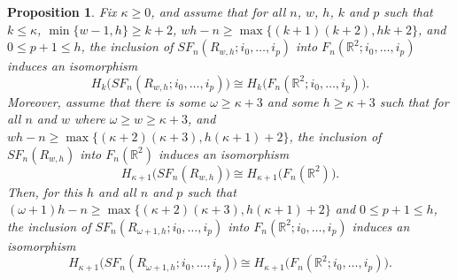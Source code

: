 \documentclass[pagebackref,colorlinks,citecolor=blue,linkcolor=blue,urlcolor=blue,filecolor=blue]{article}
\newtheorem{prop}[thm]{Proposition}
\theoremstyle{definition}\newtheorem{definition}[thm]{Definition}
\theoremstyle{definition}
\newcommand{\R}{\ensuremath{\mathbb{R}}}
\begin{document}
\begin{prop}\label{super proposition} 
Fix $\kappa\ge 0$, and assume that for all $n$, $w$, $h$, $k$ and $p$ such that $k\le\kappa$, $\min\{w-1, h\}\ge k+2$, $wh-n\ge \max\big\{(k+1)(k+2), hk+2\big\}$, and $0\le p+1\le h$, the inclusion of $SF_{n}(R_{w,h}; i_{0}, \dots, i_{p})$ into $F_{n}(\R^{2}; i_{0}, \dots, i_{p})$ induces an isomorphism
\[
H_{k}\big(SF_{n}(R_{w,h}; i_{0}, \dots, i_{p})\big)\cong H_{k}\big(F_{n}(\R^{2}; i_{0}, \dots, i_{p})\big).
\]
Moreover, assume that there is some $\omega\ge \kappa+3$ and some $h\ge \kappa+3$ such that for all $n$ and $w$ where $\omega\ge w\ge \kappa+3$, and $wh-n\ge\max\big\{(\kappa+2)(\kappa+3), h(\kappa+1)+2\big\}$, the inclusion of $SF_{n}(R_{w,h})$ into $F_{n}(\R^{2})$ induces an isomorphism
\[
H_{\kappa+1}\big(SF_{n}(R_{w,h})\big)\cong H_{\kappa+1}\big(F_{n}(\R^{2})\big).
\]
Then, for this $h$ and all $n$ and $p$ such that  $(\omega+1)h-n\ge\max\big\{(\kappa+2)(\kappa+3), h(\kappa+1)+2\big\}$ and $0\le p+1\le h$, the inclusion of $SF_{n}(R_{\omega+1,h}; i_{0}, \dots, i_{p})$ into $F_{n}(\R^{2}; i_{0}, \dots, i_{p})$ induces an isomorphism
\[
H_{\kappa+1}\big(SF_{n}(R_{\omega+1,h}; i_{0}, \dots, i_{p})\big)\cong H_{\kappa+1}\big(F_{n}(\R^{2}; i_{0}, \dots, i_{p})\big).
\]
\end{prop}
\end{document}
